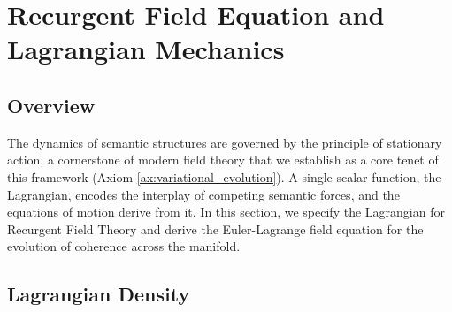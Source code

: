 \chapter{Recurgent Field Equation and Lagrangian Mechanics}
\label{ch:recurgent_field_equation_and_lagrangian_mechanics}


\section{Overview}

The dynamics of semantic structures are governed by the principle of stationary action, a cornerstone of modern field theory \autocite{GoldsteinPooleSafko2002, Arnold1989} that we establish as a core tenet of this framework (Axiom \ref{ax:variational_evolution}). A single scalar function, the Lagrangian, encodes the interplay of competing semantic forces, and the equations of motion derive from it. In this section, we specify the Lagrangian for Recurgent Field Theory and derive the Euler-Lagrange field equation for the evolution of coherence across the manifold.


\section{Lagrangian Density}
\label{sec:lagrangian_density}

